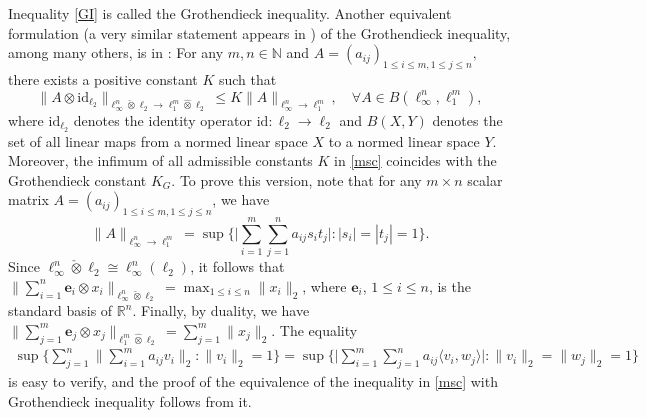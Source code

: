 \documentclass[a4paper,oneside,11pt, reqno]{amsart}
\numberwithin{equation}{section}
\theoremstyle{plain}
\begin{document}
Inequality \eqref{GI} is called the Grothendieck inequality. Another equivalent formulation (a very similar statement appears in \cite{HandbookI}) of the Grothendieck inequality, among many others,
is in \cite{RKS}: For any $m,n\in\mathbb N$ and $A=(a_{ij})_{1\leqslant i\leqslant m,1\leqslant j\leqslant n},$ there exists a positive constant $K$ such that 
\begin{equation} \label{msc} 
\|A\otimes \text{id}_{\ell_2}\|_{\ell_\infty^n\check{\otimes}\ell_2\to \ell_1^m\hat{\otimes}\ell_2}\leqslant K \|A\|_{\ell_\infty^n\to\ell_1^m}, \quad \forall A\in B(\ell^n_\infty, \ell_1^m),
\end{equation}
where $\text{id}_{\ell_2}$ denotes the identity operator $\text{id}:{\ell_2}\to \ell_2$ and $ B(X, Y)$ denotes the set of all linear maps from a normed linear space   $X$ to a normed linear space $Y$.
Moreover, the infimum of all admissible constants $K$ in \eqref{msc} coincides with the Grothendieck constant $K_G$. To prove this version, note that for any $m\times n$ scalar matrix $A=(a_{ij})_{1\leqslant i\leqslant m,1\leqslant j\leqslant n}$, we have \[\|A\|_{\ell_\infty^n\to\ell_1^m}=\sup\bigg\{\Big|\sum_{i=1}^m\sum_{j=1}^na_{ij}s_it_j\Big|:|s_i|=|t_j|=1\bigg\}.\]
Since $\ell_\infty^n\check{\otimes}\ell_2\cong\ell_\infty^n(\ell_2)$, it follows that $\|\sum_{i=1}^n\mathbf{e}_i\otimes x_i\|_{\ell_\infty^n\check{\otimes}\ell_2}=\max_{1\leqslant i\leqslant n}\|x_i\|_2$, where $\mathbf{e}_i$, $1\leqslant i \leqslant n$, is the standard basis of $\mathbb R^n$. Finally, by duality, we have $\|\sum_{j=1}^m\mathbf{e}_j\otimes x_j\|_{\ell_1^m\hat{\otimes}\ell_2}=\sum_{j=1}^m\|x_j\|_2$. The equality 
\begin{multline*} \sup \bigg\{\sum_{j=1}^n\Big \|\sum_{i=1}^ma_{ij}v_i \Big\|_2:\|v_i\|_2=1\bigg\}= \sup\bigg\{\Big |\sum_{i=1}^m\sum_{j=1}^na_{ij}\langle v_i,w_j\rangle \Big |:\|v_i\|_2=\|w_j\|_2=1\bigg\}\end{multline*}
is easy to verify, and the proof of the equivalence of the inequality in \eqref{msc} with Grothendieck inequality follows from it. 
\end{document}
